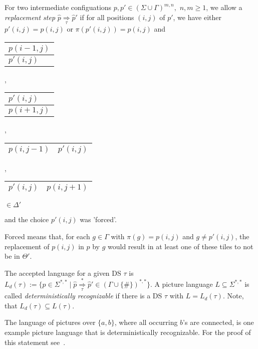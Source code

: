 \begin{definition}
For two intermediate configuations $p, p' \in (\Sigma \cup \Gamma)^{m, n},$ $n, m \geq 1$, we allow
a \emph{replacement step} $\hat{p} \underset{\tau}{\Rightarrow} \hat{p}'$ if for all positions
$(i,j)$ of $p'$, we have either $p'(i, j) = p(i, j)$ or $\pi(p'(i, j)) = p(i, j)$
and
\begin{center}
\begin{tabular}{|C{2.2cm}|} 
\hline
 $p(i - 1, j)$ \tabularnewline
\hline
 $p'(i, j)$  \tabularnewline
\hline
\end{tabular}, \begin{tabular}{|C{2.2cm}|} 
\hline
 $p'(i, j)$  \tabularnewline
\hline
 $p(i + 1, j)$ \tabularnewline
\hline
\end{tabular}, \begin{tabular}{|C{2.2cm}|C{2.2cm}|} 
\hline 
 $p(i, j - 1)$ & \hspace{0.3cm}$p'(i, j)$\hspace{0.3cm} \tabularnewline
\hline 
\end{tabular}, \begin{tabular}{|C{2.2cm}|C{2.2cm}|} 
\hline  
 \hspace{0.3cm}$p'(i, j)$\hspace{0.3cm} & $p(i, j + 1)$  \tabularnewline
\hline 
\end{tabular} 
$\in \Delta'$
\end{center} 
and the choice $p'(i,j)$ was 'forced'. 

Forced means that, for each $g\in\Gamma$ with $\pi(g) =
p(i,j)$ and $g \neq p'(i,j)$, the replacement of $p(i, j)$ in $p$ by $g$ would result in at least
one of these tiles to not be in $\Theta'$.
\label{deterministic_process_definition}
\end{definition}
The accepted language for a given DS $\tau$ is $L_d(\tau) := \{p \in \Sigma^{*,*} \mid
\hat{p} \overset{*}{\underset{\tau}{\Rightarrow}} \hat{p}' \in (\Gamma \cup
\{\#\})^{*,*}\}$. A picture language $L \subseteq \Sigma^{*,*}$ is called
\emph{deterministically recognizable} if there is a DS $\tau$ with $L = L_d(\tau)$.
Note, that $L_d(\tau) \subseteq L(\tau)$.

The language of pictures over $\{a, b\}$, where all occurring $b$'s
are connected, is one example picture language that is deterministically
recognizable. For the proof of this statement see~\cite{reinhardt1998recognizable}.
\label{deterministicprocess}